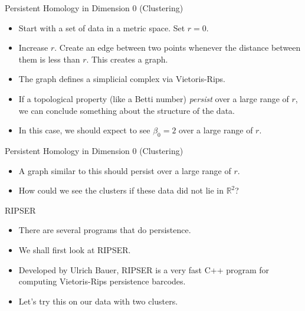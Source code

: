 \begin{frame}{Persistent Homology in Dimension 0 (Clustering)}
\begin{center}
\begin{itemize}
\item<1-> Start with a set of data in a metric space. Set $r=0$.
\item<2-> Increase $r$. Create an edge between two points whenever the distance between them is less than $r$. This creates a graph.
\item<3-> The graph defines a simplicial complex via Vietoris-Rips.
\item<4-> If a topological property (like a Betti number) \textit{persist} over a large range of $r$, we can conclude something about the structure of the data.
\item<4-> In this case, we should expect to see $\beta_0=2$ over a large range of $r$. 
\end{itemize}
\end{center}
\end{frame}
\begin{frame}{Persistent Homology in Dimension 0 (Clustering)}
\begin{center}
\end{center}
\begin{itemize}
\item<1-> A graph similar to this should persist over a large range of $r$.
\item<2-> How could we see the clusters if these data did not lie in $\mathbb{R}^2$?
\end{itemize}
\end{frame}
\begin{frame}{RIPSER}
\begin{itemize}
\item<1-> There are several programs that do persistence.
\item<2-> We shall first look at RIPSER\cite{bauer2017ripser}.
\item<3-> Developed by Ulrich Bauer, RIPSER is a very fast C++ program for computing Vietoris-Rips persistence barcodes.
\item<4-> Let's try this on our data with two clusters.
\end{itemize}
\end{frame}
